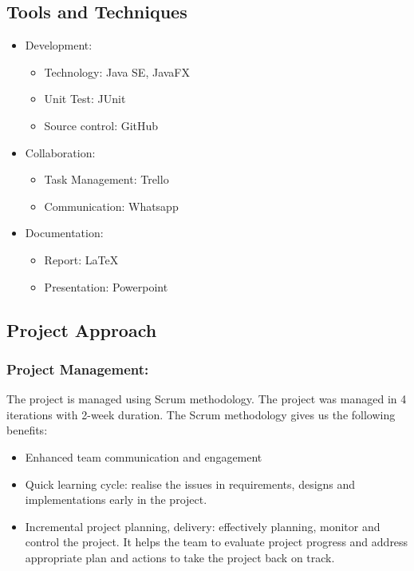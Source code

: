 \documentclass[11pt]{article}
\begin{document}
\subsection{Tools and Techniques}
\begin{itemize}


\item Development:
	\begin{itemize}[noitemsep]
	\item Technology: Java SE, JavaFX
	\item Unit Test: JUnit
	\item Source control: GitHub
	\end{itemize}
\item 	Collaboration:
	\begin{itemize}[noitemsep]
	\item Task Management: Trello
	\item Communication: Whatsapp
	\end{itemize}
\item  	Documentation:
	\begin{itemize}[noitemsep]
	\item Report: LaTeX
	\item Presentation: Powerpoint
	\end{itemize}
\end{itemize}
\subsection{Project Approach} 
    \subsubsection{Project Management: } The project is managed using Scrum methodology. 
    The project was managed in 4 iterations with 2-week duration. 
    The Scrum methodology gives us the following benefits:
    \begin{itemize}
    
    \item Enhanced team communication and engagement
    \item Quick learning cycle: realise the issues in requirements, designs and implementations early in the project. 
    \item Incremental project planning, delivery: effectively planning, monitor and control the project. It helps the team to evaluate project progress and address appropriate plan and actions to take the project back on track.
    \end{itemize}
    
\end{document}
